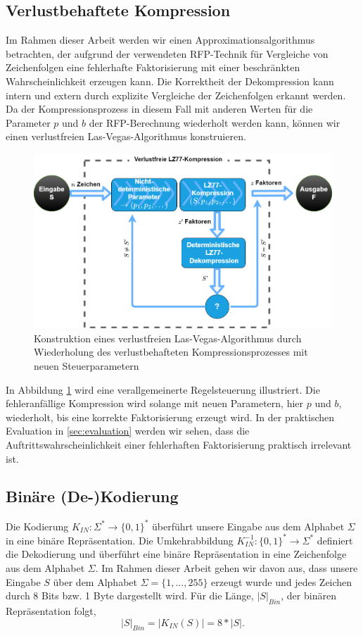 \subsection{Verlustbehaftete Kompression}
Im Rahmen dieser Arbeit werden wir einen Approximationsalgorithmus betrachten, der aufgrund der verwendeten RFP-Technik für Vergleiche von Zeichenfolgen eine fehlerhafte Faktorisierung mit 
einer beschränkten Wahrscheinlichkeit erzeugen kann. Die Korrektheit der Dekompression kann intern und extern durch explizite Vergleiche der Zeichenfolgen erkannt werden. Da der
Kompressionsprozess in diesem Fall mit anderen Werten für die Parameter $p$ und $b$ der RFP-Berechnung wiederholt werden kann, können wir einen verlustfreien Las-Vegas-Algorithmus konstruieren.

\begin{figure} [ht]
    \centering
    \caption{Konstruktion eines verlustfreien Las-Vegas-Algorithmus durch Wiederholung des verlustbehafteten Kompressionsprozesses mit neuen Steuerparametern}
    \label{fig:lasvegas}
    \includegraphics[scale=0.4]{Images/lasvegas_algorithm.png}
\end{figure}

In Abbildung \ref{fig:lasvegas} wird eine verallgemeinerte Regelsteuerung illustriert. Die fehleranfällige Kompression wird solange mit neuen Parametern, hier $p$ und $b$, wiederholt, bis
eine korrekte Faktorisierung erzeugt wird. In der praktischen Evaluation in \ref{sec:evaluation} werden wir sehen, dass die Auftrittswahrscheinlichkeit einer fehlerhaften Faktorisierung
praktisch irrelevant ist.

\subsection{Binäre (De-)Kodierung}
Die Kodierung $K_{IN}: \Sigma^* \rightarrow \{0,1\}^*$ überführt unsere Eingabe aus dem Alphabet $\Sigma$ in eine binäre Repräsentation.
Die Umkehrabbildung $K^{-1}_{IN}: \{0,1\}^* \rightarrow \Sigma^*$ definiert die Dekodierung und überführt eine binäre Repräsentation in eine Zeichenfolge
aus dem Alphabet $\Sigma$. Im Rahmen dieser Arbeit gehen wir davon aus, dass unsere Eingabe $S$ über dem Alphabet $\Sigma=\{1,...,255\}$ erzeugt wurde und 
jedes Zeichen durch 8 Bits bzw. 1 Byte dargestellt wird. Für die Länge, $|S|_{Bin}$, der binären Repräsentation folgt,
\begin{equation}
    |S|_{Bin} = |K_{IN}(S)| = 8*|S|.
\end{equation}

